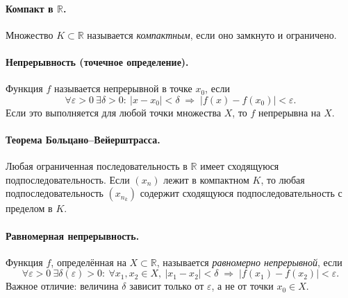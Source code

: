 
\paragraph{Компакт в $\mathbb{R}$.}
Множество $K \subset \mathbb{R}$ называется \textit{компактным},
если оно замкнуто и ограничено.

\paragraph{Непрерывность (точечное определение).}
Функция $f$ называется непрерывной в точке $x_0$, если
\[
	\forall \varepsilon > 0\ \exists \delta > 0:\
	|x - x_0| < \delta \;\Longrightarrow\; |f(x) - f(x_0)| < \varepsilon.
\]
Если это выполняется для любой точки множества $X$, то $f$ непрерывна на $X$.

\paragraph{Теорема Больцано--Вейерштрасса.}
Любая ограниченная последовательность в $\mathbb{R}$ имеет сходящуюся подпоследовательность.
Если $(x_n)$ лежит в компактном $K$, то любая подпоследовательность $(x_{n_k})$
содержит сходящуюся подпоследовательность с пределом в $K$.

\paragraph{Равномерная непрерывность.}
Функция $f$, определённая на $X \subset \mathbb{R}$, называется \textit{равномерно непрерывной},
если
\[
	\forall \varepsilon > 0\ \exists \delta(\varepsilon) > 0:\
	\forall x_1, x_2 \in X,\ |x_1 - x_2| < \delta
	\;\Longrightarrow\; |f(x_1) - f(x_2)| < \varepsilon.
\]
Важное отличие: величина $\delta$ зависит только от $\varepsilon$, а не от точки $x_0 \in X$.
